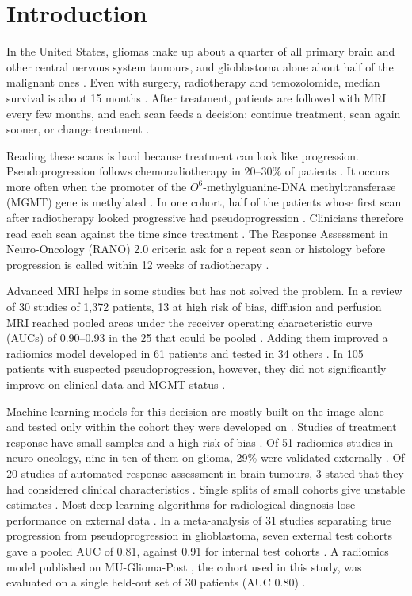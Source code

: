 \documentclass[largeformat]{interact} %
\begin{document}
\section{Introduction}\label{sec:1}

In the United States, gliomas make up about a quarter of all primary brain and other central nervous system tumours, and glioblastoma
alone about half of the malignant ones \citep{ostrom2023}. Even with surgery, radiotherapy and temozolomide, median survival is about 15 months
\citep{stupp2005}. After treatment, patients are followed with MRI every few months, and each scan feeds a decision:
continue treatment, scan again sooner, or change treatment \citep{weller2021}.

Reading these scans is hard because treatment can look like progression. Pseudoprogression follows chemoradiotherapy
in 20--30\% of patients \citep{wen2010}. It occurs more often when the promoter of the $O^6$-methylguanine-DNA methyltransferase (MGMT) gene is methylated \citep{brandes2008}.
In one cohort, half of the patients whose first scan after radiotherapy looked progressive had pseudoprogression
\citep{taal2008}. Clinicians therefore read each scan against the time since treatment \citep{weller2021}. The Response Assessment in Neuro-Oncology (RANO) 2.0 criteria ask for a repeat scan or histology before progression is called within 12 weeks of radiotherapy \citep{wen2023}.

Advanced MRI helps in some studies but has not solved the problem. In a review of 30 studies of 1,372 patients, 13 at high risk of bias, diffusion and perfusion MRI reached pooled areas under the receiver operating characteristic curve (AUCs) of 0.90--0.93 in the 25 that could be pooled
\citep{taylor2022}. Adding them improved a radiomics model developed in 61 patients and tested in 34 others
\citep{kim2019}. In 105 patients with suspected pseudoprogression, however, they did not significantly improve on
clinical data and MGMT status \citep{leone2023}.

Machine learning models for this decision are mostly built on the image alone and tested only within the cohort they were developed on
\citep{booth2022}.
Studies of treatment response have small samples and a high risk of bias \citep{booth2022}. Of 51
radiomics studies in neuro-oncology, nine in ten of them on glioma, 29\% were validated externally \citep{park2020}.
Of 20 studies of automated response assessment in brain tumours, 3 stated that they had considered clinical
characteristics \citep{shi2025}. Single splits
of small cohorts give unstable estimates \citep{an2021}. Most deep learning algorithms for radiological diagnosis lose
performance on external data \citep{yu2022}. In a meta-analysis of 31 studies separating true progression from pseudoprogression in glioblastoma, seven external
test cohorts gave a pooled AUC of 0.81, against 0.91 for internal test cohorts \citep{zhang2026meta}. A radiomics
model published on MU-Glioma-Post \citep{mahmoud2025}, the cohort used in this study, was evaluated on a single held-out
set of 30 patients (AUC 0.80) \citep{christodoulou2026,christodoulou2026code}.
\end{document}
